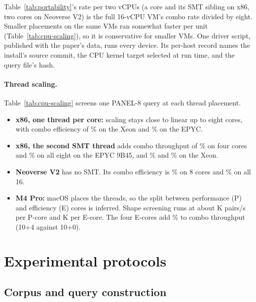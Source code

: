 Table~\ref{tab:portability}'s rate per two vCPUs (a core and its SMT sibling on
x86, two cores on Neoverse V2) is the full 16-vCPU VM's combo rate divided by
eight. Smaller placements on the same VMs ran somewhat faster per unit
(Table~\ref{tab:cpu-scaling}), so it is conservative for smaller VMs.
One driver script, published with the paper's data, runs every device. Its
per-host record names the install's source commit, the CPU kernel target
selected at run time, and the query file's hash.

\paragraph{Thread scaling.} Table~\ref{tab:cpu-scaling} screens one PANEL-8
query at each thread placement.
\begin{itemize}
\item \textbf{x86, one thread per core:} scaling stays close to linear up to
  eight cores, with combo efficiency of \ScalingXeonEightCoreEfficiencyPercent\% on
  the Xeon and \ScalingEpycEightCoreEfficiencyPercent\% on the EPYC.
\item \textbf{x86, the second SMT thread} adds combo throughput of
  \ScalingEpycSmtGainFourCorePercent\% on four cores and
  \ScalingEpycSmtGainPercent\% on all eight on the EPYC 9B45, and
  \ScalingXeonSmtGainFourCorePercent\% and \ScalingXeonSmtGainPercent\% on
  the Xeon.
\item \textbf{Neoverse V2} has no SMT. Its combo efficiency is
  \ScalingNeoverseEightCoreEfficiencyPercent\% on 8 cores and
  \ScalingNeoverseAllEfficiencyPercent\% on all 16.
\item \textbf{M4 Pro:} macOS places the threads, so the split between
	performance (P) and efficiency (E) cores is inferred. Shape screening runs at about
  \ScalingMFourProCpuShapePerPcoreThousand{}K pairs/s per P-core and
  \ScalingMFourProCpuShapePerEcoreThousand{}K per E-core. The four
  E-cores add \ScalingMFourProCpuEcoreGainPercent\% to combo
  throughput (10+4 against 10+0).
\end{itemize}



\section{Experimental protocols}
\label{app:protocols}

\subsection{Corpus and query construction}


